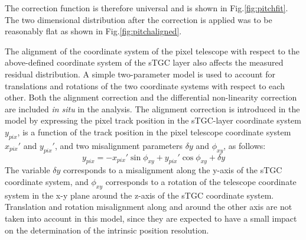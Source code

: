 	The correction function is therefore universal and is shown in Fig.\ref{fig:pitchfit}. The two dimensional
	distribution after the correction is applied was to be reasonably flat as shown in Fig.\ref{fig:pitchaligned}.\par
	The alignment of the coordinate system of the pixel telescope with respect to the above-defined coordinate system of
	the sTGC layer also affects the measured residual distribution. A simple two-parameter model is used to account for
	translations and rotations of the two coordinate systems with respect to each other. Both the alignment correction and
	the differential non-linearity correction are included {\it in situ} in the analysis. The alignment correction is
	introduced in the model by expressing the pixel track position in the sTGC-layer coordinate system $y_{pix}$, is a
	function of the track position in the pixel telescope coordinate system $x_{pix}'$ and $y_{pix}'$, and two misalignment
	parameters $\delta y$ and $\phi_{xy}$, as follows:
	\begin{equation}
	y_{pix}=-x_{pix}' \sin \phi_{xy} + y_{pix}'\cos \phi_{xy}+\delta y
	\end{equation}
	The variable $\delta y$ corresponds to a misalignment along the y-axis of the sTGC coordinate system, and $\phi_{xy}$
	corresponds to a rotation of the telescope coordinate system in the x-y plane around the z-axis of the sTGC coordinate
	system. Translation and rotation misalignment along and around the other axis are not taken into account in this model,
	since they are expected to have a small impact on the determination of the intrinsic position resolution.\par


